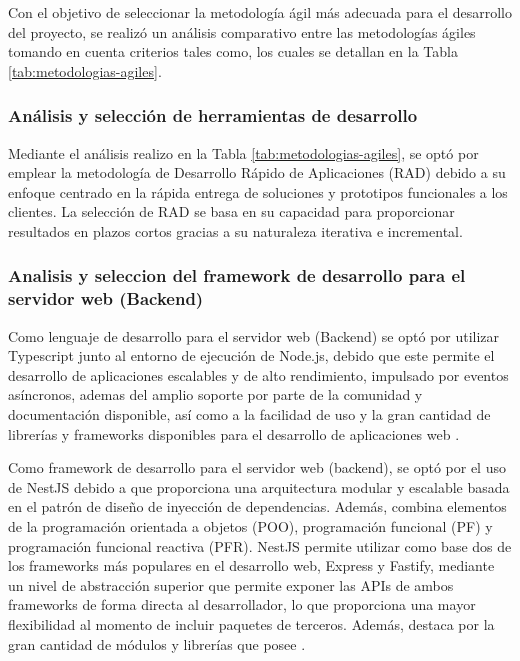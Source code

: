Con el objetivo de seleccionar la metodología ágil más adecuada para el desarrollo del proyecto, se realizó un
análisis comparativo entre las metodologías ágiles tomando en cuenta criterios tales como, los cuales se detallan en
la Tabla \ref{tab:metodologias-agiles}.




\subsubsection{Análisis y selección de herramientas de desarrollo}

Mediante el análisis realizo en la Tabla \ref{tab:metodologias-agiles}, se optó por emplear la metodología de
Desarrollo Rápido de Aplicaciones (RAD) debido a su enfoque centrado en la rápida entrega de soluciones y
prototipos funcionales a los clientes. La selección de RAD se basa en su capacidad para proporcionar resultados
en plazos cortos gracias a su naturaleza iterativa e incremental.

\subsubsection{Analisis y seleccion del framework de desarrollo para el servidor web (Backend)}

Como lenguaje de desarrollo para el servidor web (Backend) se optó por utilizar Typescript junto al entorno de
ejecución de Node.js, debido que este permite el desarrollo de aplicaciones escalables y de alto rendimiento,
impulsado por eventos asíncronos, ademas del amplio soporte por parte de la comunidad y documentación disponible,
así como a la facilidad de uso y la gran cantidad de librerías y frameworks disponibles para el desarrollo de aplicaciones
web \cite{haroDesarrolloBackendPara}.

Como framework de desarrollo para el servidor web (backend), se optó por el uso de NestJS debido a que proporciona
una arquitectura modular y escalable basada en el patrón de diseño de inyección de dependencias. Además, combina
elementos de la programación orientada a objetos (POO), programación funcional (PF) y programación funcional
reactiva (PFR). NestJS permite utilizar como base dos de los frameworks más populares en el desarrollo web, Express y
Fastify, mediante un nivel de abstracción superior que permite exponer las APIs de ambos frameworks de forma
directa al desarrollador, lo que proporciona una mayor flexibilidad al momento de incluir paquetes de terceros.
Además, destaca por la gran cantidad de módulos y librerías que posee \cite{phamDEVELOPINGBACKENDWEB2020}.

